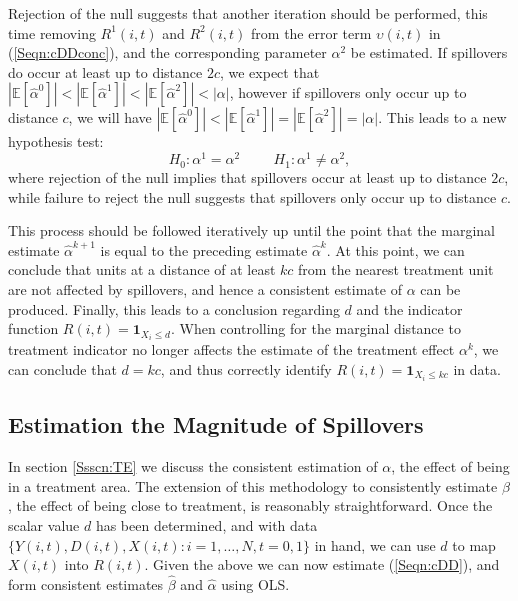 Rejection of the null suggests that another iteration should be performed, this time
removing $R^1(i,t)$ and $R^2(i,t)$ from the error term $\upsilon(i,t)$ in 
(\ref{Seqn:cDDconc}), and the corresponding 
parameter $\alpha^2$ be estimated.  If spillovers do occur at least up to distance 
$2c$, we expect that $|\mathbb{E}[\hat\alpha^0]|<|\mathbb{E}[\hat\alpha^1]|<
|\mathbb{E}[\hat\alpha^2]|<|\alpha|$, however if spillovers only occur up to distance
$c$, we will have $|\mathbb{E}[\hat\alpha^0]|<|\mathbb{E}[\hat\alpha^1]|=
|\mathbb{E}[\hat\alpha^2]|=|\alpha|$.  This leads to a new hypothesis test:
\[
H_0: \alpha^1=\alpha^2 \hspace{1cm}
H_1: \alpha^1\neq\alpha^2,
\]
where rejection of the null implies that spillovers occur at least up to distance
$2c$, while failure to reject the null suggests that spillovers only occur up to 
distance $c$.

This process should be followed iteratively up until the point that the marginal 
estimate $\hat\alpha^{k+1}$ is equal to the preceding estimate $\hat\alpha^{k}$.  At
this point, we can conclude that units at a distance of at least $kc$ from the 
nearest treatment unit are not affected by spillovers, and hence a consistent 
estimate of $\alpha$ can be produced.  Finally, this leads to a conclusion regarding
$d$ and the indicator function $R(i,t)=\mathbf{1}_{X_i\leq d}$.  When controlling
for the marginal distance to treatment indicator no longer affects the estimate of 
the treatment effect $\alpha^k$, we can conclude that $d=kc$, and thus correctly 
identify $R(i,t)=\mathbf{1}_{X_i\leq kc}$ in data.


\subsection{Estimation the Magnitude of Spillovers}
\label{Ssscn:SE}
In section \ref{Ssscn:TE} we discuss the consistent estimation of $\alpha$, the
effect of being in a treatment area.  The extension of this methodology to 
consistently estimate $\beta$, the effect of being close to treatment, is 
reasonably straightforward.  Once the scalar value $d$ has been determined, and
with data $\{Y(i,t), D(i,t), X(i,t): i=1, \ldots, N, t=0, 1\}$ in hand, we can 
use $d$ to map $X(i,t)$ into $R(i,t)$. Given the above we can now estimate 
(\ref{Seqn:cDD}), and form consistent estimates $\hat\beta$ and $\hat\alpha$ using 
OLS.

